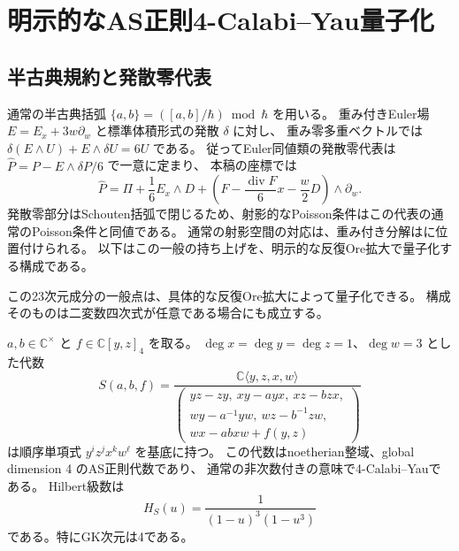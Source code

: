 \section{明示的なAS正則4-Calabi--Yau量子化}
\subsection{半古典規約と発散零代表}
通常の半古典括弧 $\{a,b\}=([a,b]/\hbar)\bmod\hbar$ を用いる。
重み付きEuler場 $E=E_x+3w\partial_w$ と標準体積形式の発散 $\delta$ に対し、
重み零多重ベクトルでは $\delta(E\wedge U)+E\wedge\delta U=6U$ である。
従ってEuler同値類の発散零代表は $\widehat P=P-E\wedge\delta P/6$ で一意に定まり、
本稿の座標では
\[
 \widehat P=\Pi+\frac16E_x\wedge D+
 \left(F-\frac{\operatorname{div}F}{6}x-\frac w2D\right)\wedge\partial_w.
\]
発散零部分はSchouten括弧で閉じるため、射影的なPoisson条件はこの代表の通常のPoisson条件と同値である。
通常の射影空間の対応は\cite[\S2.2]{Pym}、重み付き分解は\cite{TWW}に位置付けられる。
以下はこの一般の持ち上げを、明示的な反復Ore拡大で量子化する構成である。


\label{subsec:resonance-ore-cy-v32}

この23次元成分の一般点は、具体的な反復Ore拡大によって量子化できる。
構成そのものは二変数四次式が任意である場合にも成立する。

\begin{proposition}[二変数四次式のOre族]
\label{prop:binary-quartic-ore-v32}
$a,b\in\mathbb C^\times$ と $f\in\mathbb C[y,z]_4$ を取る。
$\deg x=\deg y=\deg z=1$、$\deg w=3$ とした代数
\[
 S(a,b,f)=\frac{\mathbb C\langle y,z,x,w\rangle}{
 \left(\begin{array}{c}
 yz-zy,\ xy-ayx,\ xz-bzx,\\
 wy-a^{-1}yw,\ wz-b^{-1}zw,\\
 wx-abxw+f(y,z)
 \end{array}\right)}
\]
は順序単項式 $y^iz^jx^kw^\ell$ を基底に持つ。
この代数はnoetherian整域、global dimension 4 のAS正則代数であり、
通常の非次数付きの意味で4-Calabi--Yauである。
Hilbert級数は
\[
 H_S(u)=\frac1{(1-u)^3(1-u^3)}
\]
である。特にGK次元は4である。
\end{proposition}

